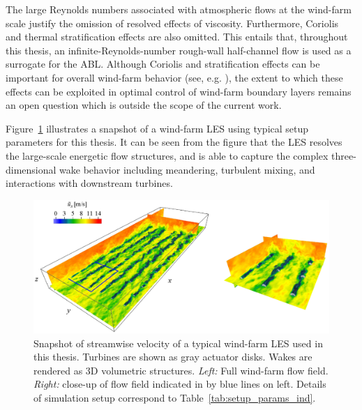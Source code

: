 The large Reynolds numbers associated with atmospheric flows at the wind-farm scale justify the omission of resolved effects of viscosity. Furthermore, Coriolis and thermal stratification effects are also omitted. This entails that, throughout this thesis, an infinite-Reynolds-number rough-wall half-channel flow is used as a surrogate for the ABL. Although Coriolis and stratification effects can be important for overall wind-farm behavior (see, e.g. \citealp{allaerts2015large, allaerts2017boundary}), the extent to which these effects can be exploited in optimal control of wind-farm boundary layers remains an open question which is outside the scope of the current work. 

Figure~\ref{fig:les_field} illustrates a snapshot of a wind-farm LES using typical setup parameters for this thesis. It can be seen from the figure that the LES resolves the large-scale energetic flow structures, and is able to capture the complex three-dimensional wake behavior including meandering, turbulent mixing, and interactions with downstream turbines.

\begin{figure}
	\centering
	\includegraphics[width=\linewidth]{chapters/methodology/les_field.eps}
	\caption[Snapshot of streamwise velocity of a typical wind-farm LES used in this thesis.]{Snapshot of streamwise velocity of a typical wind-farm LES used in this thesis. Turbines are shown as gray actuator disks. Wakes are rendered as 3D volumetric structures. \emph{Left: } Full wind-farm flow field. \emph{Right: } close-up of flow field indicated in by blue lines on left. Details of simulation setup correspond to Table~\ref{tab:setup_params_ind}. \label{fig:les_field}}
\end{figure}

